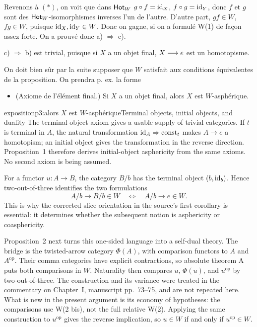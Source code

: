 Revenons à $(*)$, on voit que dans $\mathsf{Hot}_W$ $g \circ f = \mathrm{id}_X$, $f \circ g = \mathrm{id}_Y$, donc $f$ et $g$ sont des $\mathsf{Hot}_W$-isomorphismes inverses l'un de l'autre. D'autre part, $gf \in W$, $fg \in W$, puisque $\mathrm{id}_X, \mathrm{id}_Y \in W$. Donc on gagne, si on a formulé W(1) de façon assez forte. On a prouvé donc a) $\Longrightarrow$ c).

c) $\Longrightarrow$ b) est trivial, puisque si $X$ a un objet final, $X \longrightarrow e$ est un homotopisme.


On doit bien sûr par la suite supposer que $W$ satisfait aux conditions équivalentes de la proposition. On prendra p. ex. la forme

\begin{itemize}[leftmargin=*]
\item[\textbf{W(3)}] (Axiome de l'élément final.) Si $X$ a un objet final, alors $X$ est $W$-asphérique.
\end{itemize}

\begin{dcomment}{exposition}{p3:alors $X$ est $W$-asphérique}{Terminal objects, initial objects, and duality}
The terminal-object axiom gives a usable supply of trivial categories. If \(t\) is terminal in \(A\), the natural transformation \(\mathrm{id}_A\Rightarrow \operatorname{const}_t\) makes \(A\to e\) a homotopism; an initial object gives the transformation in the reverse direction. Proposition~1 therefore derives initial-object asphericity from the same axioms. No second axiom is being assumed.

For a functor \(u:A\to B\), the category \(B/b\) has the terminal object \((b,\mathrm{id}_b)\). Hence two-out-of-three identifies the two formulations
\[
 A/b\longrightarrow B/b\in W
 \quad\Longleftrightarrow\quad A/b\longrightarrow e\in W .
\]
This is why the corrected slice orientation in the source's first corollary is essential: it determines whether the subsequent notion is asphericity or coasphericity.

Proposition~2 next turns this one-sided language into a self-dual theory. The bridge is the twisted-arrow category \(\Phi(A)\), with comparison functors to \(A\) and \(A^{\mathrm{op}}\). Their comma categories have explicit contractions, so absolute theorem A puts both comparisons in \(W\). Naturality then compares \(u\), \(\Phi(u)\), and \(u^{\mathrm{op}}\) by two-out-of-three. The construction and its variance were treated in the commentary on Chapter~I, manuscript pp.~73--75, and are not repeated here. What is new in the present argument is its economy of hypotheses: the comparisons use W(2 bis), not the full relative W(2). Applying the same construction to \(u^{\mathrm{op}}\) gives the reverse implication, so \(u\in W\) if and only if \(u^{\mathrm{op}}\in W\).
\end{dcomment}


